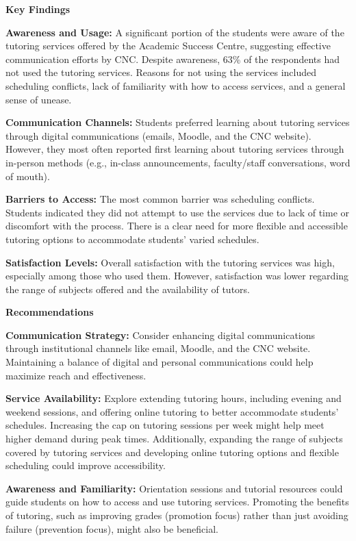 {\Large\textbf{Key Findings}

\normalsize

    \textbf{Awareness and Usage:}
        A significant portion of the students were aware of the tutoring services offered by the Academic Success Centre, suggesting effective communication efforts by CNC.
        Despite awareness, 63\% of the respondents had not used the tutoring services. Reasons for not using the services included scheduling conflicts, lack of familiarity with how to access services, and a general sense of unease.

   \textbf{Communication Channels:}
        Students preferred learning about tutoring services through digital communications (emails, Moodle, and the CNC website). However, they most often reported first learning about tutoring services through in-person methods (e.g., in-class announcements, faculty/staff conversations, word of mouth).

    \textbf{Barriers to Access:}
        The most common barrier was scheduling conflicts. Students indicated they did not attempt to use the services due to lack of time or discomfort with the process.
        There is a clear need for more flexible and accessible tutoring options to accommodate students’ varied schedules.

    \textbf{Satisfaction Levels:}
        Overall satisfaction with the tutoring services was high, especially among those who used them. However, satisfaction was lower regarding the range of subjects offered and the availability of tutors.

\Large\textbf{Recommendations}

\normalsize

    \textbf{Communication Strategy:}
Consider enhancing digital communications through institutional channels like email, Moodle, and the CNC website. Maintaining a balance of digital and personal communications could help maximize reach and effectiveness.

    \textbf{Service Availability:}
        Explore extending tutoring hours, including evening and weekend sessions, and offering online tutoring to better accommodate students’ schedules. Increasing the cap on tutoring sessions per week might help meet higher demand during peak times. Additionally, expanding the range of subjects covered by tutoring services and developing online tutoring options and flexible scheduling could improve accessibility.

    \textbf{Awareness and Familiarity:}
        Orientation sessions and tutorial resources could guide students on how to access and use tutoring services. Promoting the benefits of tutoring, such as improving grades (promotion focus) rather than just avoiding failure (prevention focus), might also be beneficial.

}
